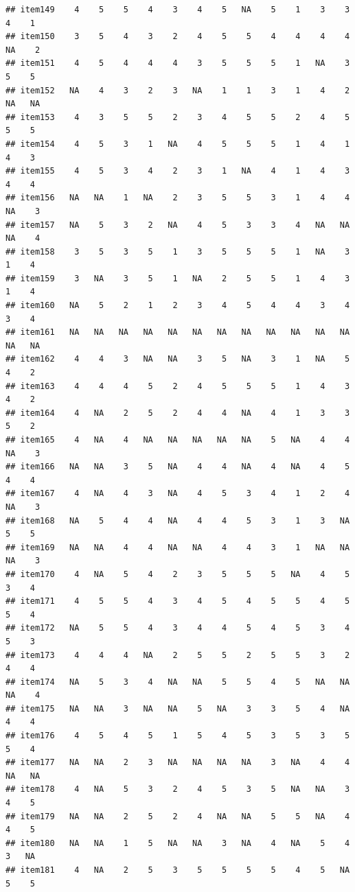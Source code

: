 \documentclass[
  man]{apa6}
\begin{document}
\begin{verbatim}
## item149    4    5    5    4    3    4    5   NA    5    1    3    3    4    1
## item150    3    5    4    3    2    4    5    5    4    4    4    4   NA    2
## item151    4    5    4    4    4    3    5    5    5    1   NA    3    5    5
## item152   NA    4    3    2    3   NA    1    1    3    1    4    2   NA   NA
## item153    4    3    5    5    2    3    4    5    5    2    4    5    5    5
## item154    4    5    3    1   NA    4    5    5    5    1    4    1    4    3
## item155    4    5    3    4    2    3    1   NA    4    1    4    3    4    4
## item156   NA   NA    1   NA    2    3    5    5    3    1    4    4   NA    3
## item157   NA    5    3    2   NA    4    5    3    3    4   NA   NA   NA    4
## item158    3    5    3    5    1    3    5    5    5    1   NA    3    1    4
## item159    3   NA    3    5    1   NA    2    5    5    1    4    3    1    4
## item160   NA    5    2    1    2    3    4    5    4    4    3    4    3    4
## item161   NA   NA   NA   NA   NA   NA   NA   NA   NA   NA   NA   NA   NA   NA
## item162    4    4    3   NA   NA    3    5   NA    3    1   NA    5    4    2
## item163    4    4    4    5    2    4    5    5    5    1    4    3    4    2
## item164    4   NA    2    5    2    4    4   NA    4    1    3    3    5    2
## item165    4   NA    4   NA   NA   NA   NA   NA    5   NA    4    4   NA    3
## item166   NA   NA    3    5   NA    4    4   NA    4   NA    4    5    4    4
## item167    4   NA    4    3   NA    4    5    3    4    1    2    4   NA    3
## item168   NA    5    4    4   NA    4    4    5    3    1    3   NA    5    5
## item169   NA   NA    4    4   NA   NA    4    4    3    1   NA   NA   NA    3
## item170    4   NA    5    4    2    3    5    5    5   NA    4    5    3    4
## item171    4    5    5    4    3    4    5    4    5    5    4    5    5    4
## item172   NA    5    5    4    3    4    4    5    4    5    3    4    5    3
## item173    4    4    4   NA    2    5    5    2    5    5    3    2    4    4
## item174   NA    5    3    4   NA   NA    5    5    4    5   NA   NA   NA    4
## item175   NA   NA    3   NA   NA    5   NA    3    3    5    4   NA    4    4
## item176    4    5    4    5    1    5    4    5    3    5    3    5    5    4
## item177   NA   NA    2    3   NA   NA   NA   NA    3   NA    4    4   NA   NA
## item178    4   NA    5    3    2    4    5    3    5   NA   NA    3    4    5
## item179   NA   NA    2    5    2    4   NA   NA    5    5   NA    4    4    5
## item180   NA   NA    1    5   NA   NA    3   NA    4   NA    5    4    3   NA
## item181    4   NA    2    5    3    5    5    5    5    4    5   NA    5    5

\end{verbatim}
\end{document}
